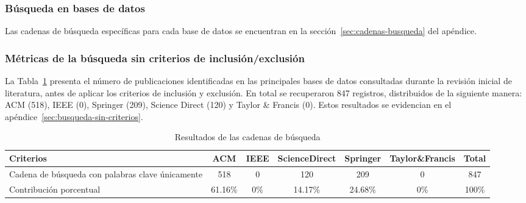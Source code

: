 



\subsubsection{Búsqueda en bases de datos}\label{par:busquedaBasesDatos}
\noindent
Las cadenas de búsqueda específicas para cada base de datos se encuentran en la sección~\ref{sec:cadenas-busqueda} del apéndice.

\subsubsection{Métricas de la búsqueda sin criterios de inclusión/exclusión}\label{subsubsec:resumenBusqueda}
\noindent
La Tabla~\ref{table:bases-sin-exclusion} presenta el número de publicaciones identificadas en las principales bases de datos consultadas durante la revisión inicial de literatura, antes de aplicar los criterios de inclusión y exclusión. En total se recuperaron 847 registros, distribuidos de la siguiente manera: ACM (518), IEEE (0), Springer (209), Science Direct (120) y Taylor \& Francis (0). Estos resultados se evidencian en el apéndice~\ref{sec:busqueda-sin-criterios}.

\begin{table}[H]
	\centering
	\caption{Resultados de las cadenas de búsqueda}
	\label{table:bases-sin-exclusion}
	\begin{tabular}{|p{4.5cm}|c|c|c|c|c|c|}
		\hline
		\textbf{Criterios}                               & \textbf{ACM} & \textbf{IEEE} & \textbf{ScienceDirect} & \textbf{Springer} & \textbf{Taylor\&Francis} & \textbf{Total} \\
		\hline
		Cadena de búsqueda con palabras clave únicamente & 518          & 0             & 120                    & 209               & 0                        & 847            \\
		\hline
		Contribución porcentual                          & 61.16\%      & 0\%           & 14.17\%                & 24.68\%           & 0\%                      & 100\%          \\
		\hline
	\end{tabular}
\end{table}



